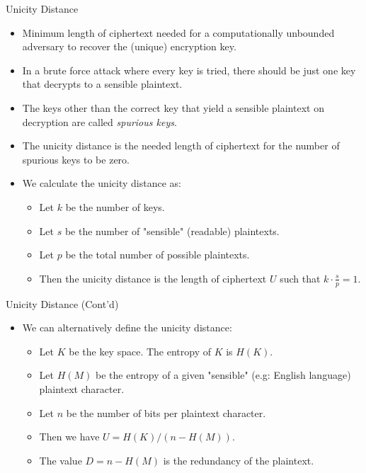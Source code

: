 \documentclass[presentation]{beamer}
\begin{document}
\begin{frame}[label=sec-5]{Unicity Distance}
\begin{itemize}[<+->]
\item Minimum length of ciphertext needed for a computationally unbounded adversary to recover the (unique) encryption key.
\item In a brute force attack where every key is tried, there should be just one key that decrypts to a sensible plaintext.
\item The keys other than the correct key that yield a sensible plaintext on decryption are called \emph{spurious keys}.
\item The unicity distance is the needed length of ciphertext for the number of spurious keys to be zero.
\item We calculate the unicity distance as:
\begin{itemize}
\item Let $k$ be the number of keys.
\item Let $s$ be the number of "sensible" (readable) plaintexts.
\item Let $p$ be the total number of possible plaintexts.
\item Then the unicity distance is the length of ciphertext $U$ such that $k \cdot \frac{s}{p} = 1$.
\end{itemize}
\end{itemize}
\end{frame}
\begin{frame}[label=sec-6]{Unicity Distance (Cont'd)}
\begin{itemize}[<+->]
\item We can alternatively define the unicity distance:
\begin{itemize}
\item Let $K$ be the key space. The entropy of $K$ is $H(K)$.
\item Let $H(M)$ be the entropy of a given "sensible" (e.g: English language) plaintext character.
\item Let $n$ be the number of bits per plaintext character.
\item Then we have $U = H(K) / (n - H(M))$.
\item The value $D = n - H(M)$ is the redundancy of the plaintext.
\end{itemize}
\end{itemize}
\end{frame}
\end{document}
